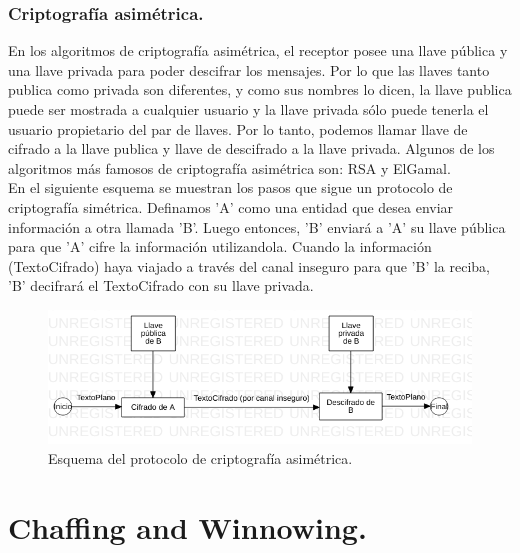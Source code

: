 \documentclass[12pt, a4paper, titlepage]{report}
\begin{document}
        		\subsubsection{Criptografía asimétrica.}
        		En los algoritmos de criptografía asimétrica, el receptor posee una llave pública y una llave privada para poder descifrar los mensajes. Por lo que las llaves tanto publica como privada son diferentes, y como sus nombres lo dicen, la llave publica puede ser mostrada a cualquier usuario y la llave privada sólo puede tenerla el usuario propietario del par de llaves. Por lo tanto, podemos llamar llave de cifrado a la llave publica y llave de descifrado a la llave privada. Algunos de los algoritmos más famosos de criptografía asimétrica son: RSA y ElGamal. \cite{refChaffing}\\
        		En el siguiente esquema se muestran los pasos que sigue un protocolo de criptografía simétrica. Definamos 'A' como una entidad que desea enviar información a otra llamada 'B'. Luego entonces, 'B' enviará a 'A' su llave pública para que 'A' cifre la información utilizandola. Cuando la información (TextoCifrado) haya viajado a través del canal inseguro para que 'B' la reciba, 'B' decifrará el TextoCifrado con su llave privada.
        		
        		\begin{figure}[H]
        			\begin{center}	                  \includegraphics[width=14cm]{./imagenes/MarcoTeorico/cripto_asimetrica.png}
        				\caption{Esquema del protocolo de criptografía asimétrica.}
        			\end{center}
        		\end{figure}
        		
	    
	    \section{Chaffing and Winnowing.}
	    
\end{document}
